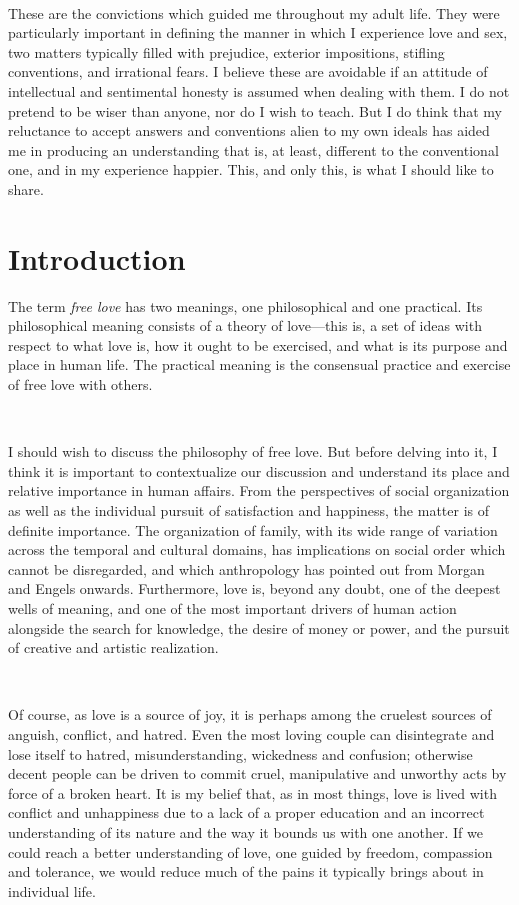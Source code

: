 \documentclass[a4paper, 12pt]{article}
\begin{document}
~

These are the convictions which guided me throughout my adult life. They were
particularly important in defining the manner in which I experience love
and sex, two matters typically filled with prejudice, exterior impositions, stifling
conventions, and irrational fears. I believe these are avoidable if an
attitude of intellectual and sentimental honesty is assumed when dealing with
them. I do not pretend to be wiser than anyone, nor do I wish to teach. But I
do think that my reluctance to accept answers and conventions alien to
my own ideals has aided me in producing an understanding that is, at least,
different to the conventional one, and in my experience happier. This, and only
this, is what I should like to share.


\section{Introduction}

The term \textit{free love} has two meanings, one philosophical and one
practical. Its philosophical meaning consists of a theory of
love---this is, a set of ideas with respect to what love is, how it ought to be
exercised, and what is its purpose and place in human life. 
The practical meaning is the consensual practice and exercise of free love with
others. 

~ 

I should wish to discuss the philosophy of free love. But before delving into
it, I think it is important to contextualize our discussion and understand its
place and relative importance in human affairs. From the perspectives of social
organization as well as the individual pursuit of satisfaction and happiness,
the matter is of definite importance. The organization of family, with its wide
range of variation across the temporal and cultural domains, has implications
on social order which cannot be disregarded, and which anthropology has pointed
out from Morgan and Engels onwards. Furthermore, love is, beyond any doubt, one
of the deepest wells of meaning, and one of the most important drivers of human
action alongside the search for knowledge, the desire of money or power, and
the pursuit of creative and artistic realization. 

~ 

Of course, as love is a source of joy, it is perhaps among the cruelest sources
of anguish, conflict, and hatred. Even the most loving couple can
disintegrate and lose itself to hatred, misunderstanding,
wickedness and confusion; otherwise decent people can be driven to commit
cruel, manipulative and unworthy acts by force of a broken heart. It is my
belief that, as in most things, love is lived with conflict and
unhappiness due to a lack of a proper education and an incorrect understanding
of its nature and the way it bounds us with one another. If we could reach a
better understanding of love, one guided by freedom, compassion and tolerance,
we would reduce much of the pains it typically brings about in individual life.
\end{document}
